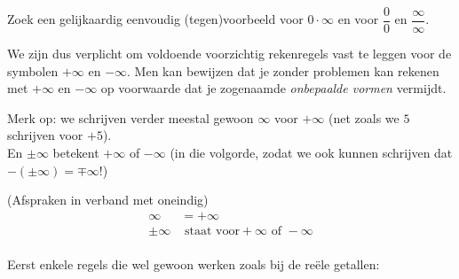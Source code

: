 \documentclass{ximera}
\begin{document}
\begin{example}
	Zoek een gelijkaardig eenvoudig (tegen)voorbeeld voor $0\cdot\infty$ en voor $\dfrac00$ en $\dfrac\infty\infty$.
\end{example}



We zijn dus verplicht om voldoende voorzichtig rekenregels vast te leggen voor de symbolen $+\infty$ en $-\infty$. Men kan bewijzen dat je zonder problemen kan rekenen met $+\infty$ en $-\infty$  op voorwaarde dat je zogenaamde \textit{onbepaalde vormen} vermijdt.

Merk op: we schrijven verder meestal gewoon $\infty$ voor $+\infty$ (net zoals we $5$ schrijven voor $+5$). \\
En $\pm\infty$ betekent $+\infty$ of $-\infty$ (in die volgorde, zodat we ook kunnen schrijven dat $-(\pm\infty) = \mp\infty$!)

\begin{notation} (Afspraken in verband met oneindig)	
	\begin{align*}
	\infty & = +\infty   \\
	\pm\infty &\text{ staat voor} +\infty \text{ of } -\infty \\
	\end{align*}
\end{notation}


Eerst enkele regels die wel gewoon werken zoals bij de reële getallen:
\end{document}
